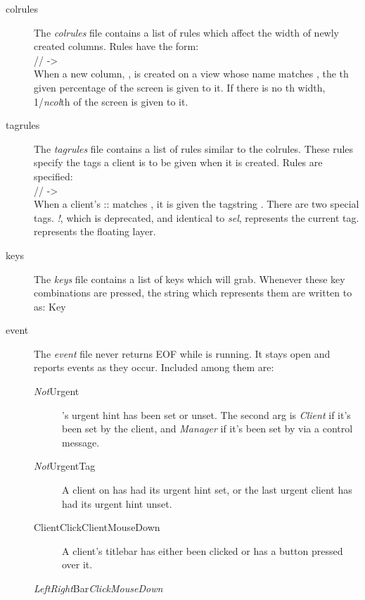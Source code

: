 \begin{description}
\item[colrules] The \emph{colrules} file contains a list of
	rules which affect the width of newly created columns.
	Rules have the form: \\ \SP %
	\MANbr
	\SP\SP // ->  \\ \SP
	\MANbr
	When a new column, , is created on a view whose
	name matches , the th given
	 percentage of the screen is given to it. If
	there is no th width, 1/\emph{ncol}th of the
	screen is given to it.
\item[tagrules] The \emph{tagrules} file contains a list of
	rules similar to the colrules. These rules specify 
	the tags a client is to be given when it is created.
	Rules are specified: \\ \SP
	\MANbr
	\SP\SP // ->  \\ \SP
	\MANbr
	When a client's :: matches
	, it is given the tagstring . There are
	two special tags. \emph{!}, which is deprecated, and identical
	to \emph{sel}, represents the current tag. \emph{\Tilde}
	represents the floating layer.
\item[keys] The \emph{keys} file contains a list of keys which
	 will grab. Whenever these key combinations
	are pressed, the string which represents them are
	written to  as: Key 
\item[event] The \emph{event} file never returns EOF while
	 is running. It stays open and reports events
	as they occur. Included among them are:
	\begin{description}
	\item[\emph{Not}Urgent  ]
		's urgent hint has been set or
		unset. The second arg is \emph{Client} if it's
		been set by the client, and \emph{Manager} if
		it's been set by  via a control
		message.
	\item[\emph{Not}UrgentTag  ]
		A client on  has had its urgent hint
		set, or the last urgent client has had its
		urgent hint unset.
	\item[ClientClick\Bar ClientMouseDown  ]
		A client's titlebar has either been clicked or
		has a button pressed over it.
	\item[\emph{Left\Bar Right}Bar\emph{Click\Bar MouseDown}  ]

\end{description}
\end{description}
